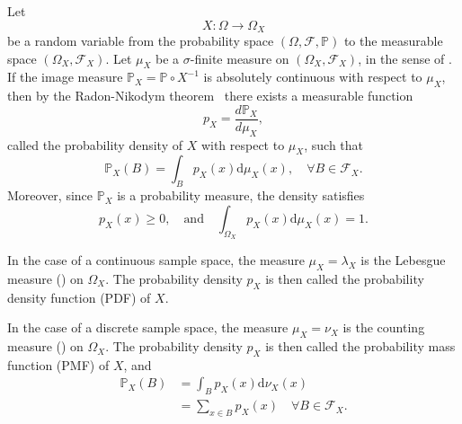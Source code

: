 \begin{definition}
	\label{def:prob_density_general}
	Let
	\begin{equation}
		X\colon \Omega \to \Omega_X
	\end{equation}
	be a random variable from the probability space $(\Omega, \mathcal{F}, \mathbb{P})$ to the measurable space $(\Omega_X, \mathcal{F}_X)$. Let $\mu_X$ be a $\sigma$-finite measure on $(\Omega_X, \mathcal{F}_X)$, in the sense of . If the image measure $\mathbb{P}_X = \mathbb{P} \circ X^{-1}$ is absolutely continuous with respect to $\mu_X$, then by the Radon-Nikodym theorem~\cite{Navratil1981} there exists a measurable function
	\begin{equation}
		p_X = \frac{d\mathbb{P}_X}{d\mu_X},
	\end{equation}
	called the probability density of $X$ with respect to $\mu_X$, such that
	\begin{equation}
		\mathbb{P}_X(B) = \int_B p_X(x) \mathrm{d}\mu_X(x), \quad \forall B \in \mathcal{F}_X.
	\end{equation}
	Moreover, since $\mathbb{P}_X$ is a probability measure, the density satisfies
	\begin{equation}
		p_X(x) \ge 0, \quad \text{and} \quad
		\int_{\Omega_X} p_X(x) \mathrm{d}\mu_X(x) = 1.
	\end{equation}
\end{definition}

\begin{remark}
	\label{remark:pdf}
	In the case of a continuous sample space, the measure $\mu_X = \lambda_X$ is the Lebesgue measure () on $\Omega_X$. The probability density $p_X$ is then called the probability density function (PDF) of $X$. 
\end{remark}

\begin{remark}
	\label{remark:pmf}
	In the case of a discrete sample space, the measure $\mu_X = \nu_X$ is the counting measure () on $\Omega_X$. The probability density $p_X$ is then called the probability mass function (PMF) of $X$, and
	\begin{equation}
		\begin{split}
			\mathbb{P}_X(B)&= \int_B p_X(x) \mathrm{d}\nu_X(x)\\
			&= \sum_{x \in B} p_X(x) \quad \forall B \in \mathcal{F}_X.
		\end{split}
	\end{equation}
\end{remark}


